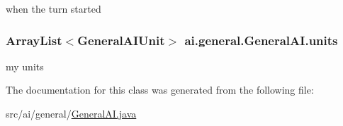 \label{classai_1_1general_1_1_general_a_i_ad2b487046bcf8f6266ea279f180b3e74}
when the turn started \hypertarget{classai_1_1general_1_1_general_a_i_acc56ad41f2a1b117bd47a0c4e5da7a36}{
\subsubsection[{units}]{\setlength{\rightskip}{0pt plus 5cm}ArrayList$<${\bf GeneralAIUnit}$>$ {\bf ai.general.GeneralAI.units}}}
\label{classai_1_1general_1_1_general_a_i_acc56ad41f2a1b117bd47a0c4e5da7a36}
my units 

The documentation for this class was generated from the following file:\begin{DoxyCompactItemize}
\item 
src/ai/general/\hyperlink{_general_a_i_8java}{GeneralAI.java}\end{DoxyCompactItemize}
